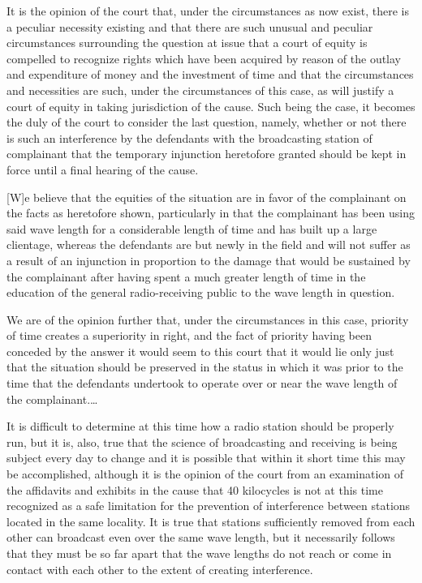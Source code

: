 It is the opinion of the court that, under the circumstances as now exist, there
is a peculiar necessity existing and that there are such unusual and peculiar
circumstances surrounding the question at issue that a court of equity is
compelled to recognize rights which have been acquired by reason of the outlay
and expenditure of money and the investment of time and that the
circumstances and necessities are such, under the circumstances of this case,
as will justify a court of equity in taking jurisdiction of the cause. Such
being the case, it becomes the duly of the court to consider the last question,
namely, whether or not there is such an interference by the defendants with the
broadcasting station of complainant that the temporary injunction
heretofore granted should be kept in force until a final hearing of the
cause.

[W]e believe that the equities of the situation are in favor of the complainant
on the facts as heretofore shown, particularly in that the complainant has been
using said wave length for a considerable length of time and has built up a
large clientage, whereas the defendants are but newly in the field and will not
suffer as a result of an injunction in proportion to the damage that would be
sustained by the complainant after having spent a much greater length of time
in the education of the general radio-receiving public to the wave length in
question.

We are of the opinion further that, under the circumstances in this case,
priority of time creates a superiority in right, and the fact of priority
having been conceded by the answer it would seem to this court that it would
lie only just that the situation should be preserved in the status in which it
was prior to the time that the defendants undertook to operate over or near the
wave length of the complainant.\ldots

It is difficult to determine at this time how a radio station should be properly
run, but it is, also, true that the science of broadcasting and receiving is
being subject every day to change and it is possible that within it short time
this may be accomplished, although it is the opinion of the court from an
examination of the affidavits and exhibits in the cause that 40 kilocycles is
not at this time recognized as a safe limitation for the prevention of
interference between stations located in the same locality. It is true that
stations sufficiently removed from each other can broadcast even over the
same wave length, but it necessarily follows that they must be so far apart
that the wave lengths do not reach or come in contact with each other to the
extent of creating interference.

